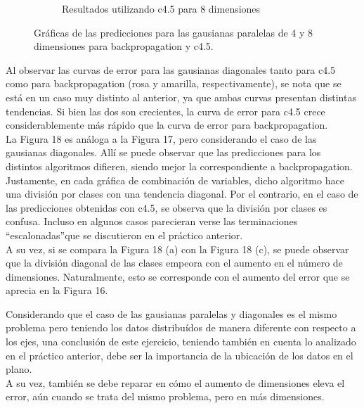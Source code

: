 \documentclass[12pt, a4paper]{article}
\begin{document}
\begin{figure}
\begin{subfigure}[b]{0.45\textwidth}
        \caption{Resultados utilizando c4.5 para 8 dimensiones}  
    \end{subfigure}

   \caption{Gráficas de las predicciones para las gausianas paralelas de 4 y 8 dimensiones para backpropagation y c4.5.}
\end{figure}

\bigskip

Al observar las curvas de error para las gausianas diagonales tanto para c4.5 como para backpropagation (rosa y amarilla, respectivamente), se nota que se está en un caso muy distinto al anterior, ya que ambas curvas presentan distintas tendencias. Si bien las dos son crecientes, la curva de error para c4.5 crece considerablemente más rápido que la curva de error para backpropagation.  \\
La Figura 18 es análoga a la Figura 17, pero considerando el caso de las gausianas diagonales. Allí se puede observar que las predicciones para los distintos algoritmos difieren, siendo mejor la correspondiente a backpropagation. Justamente, en cada gráfica de combinación de variables, dicho algoritmo hace una división por clases con una tendencia diagonal. Por el contrario, en el caso de las predicciones obtenidas con c4.5, se observa que la división por clases es confusa. Incluso en algunos casos parecieran verse las terminaciones \textquotedblleft escalonadas\textquotedblright que se discutieron en el práctico anterior.\\
A su vez, si se compara la Figura 18 (a) con la Figura 18 (c), se puede observar que la división diagonal de las clases empeora con el aumento en el número de dimensiones. Naturalmente, esto se corresponde con el aumento del error que se aprecia en la Figura 16.

\bigskip

Considerando que el caso de las gausianas paralelas y diagonales es el mismo problema pero teniendo los datos distribuídos de manera diferente con respecto a los ejes,
una conclusión de este ejercicio, teniendo también en cuenta lo analizado en el práctico anterior, debe ser la importancia de la ubicación de los datos en el plano.\\
A su vez, también se debe reparar en cómo el aumento de dimensiones eleva el error, aún cuando se trata del mismo problema, pero en más dimensiones.
\end{document}
